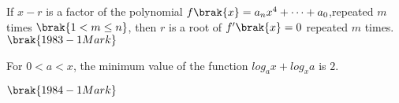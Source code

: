 \iffalse
\title{Assignment}
\author{ee24btech11056-S.Kavya Anvitha}
\section{true-false}     
\fi


\item[1.] If $x-r$ is a factor of the polynomial
$f\brak{x} = a_{n}x^{4}+\dots+a_{0}$,repeated $m$ times $\brak{1< m\leq n}$, 
then $r$ is a root of $f^\prime\brak{x}=0$ repeated $m$ times.
\hfill$\brak{1983 - 1 Mark}$

\item[2.] For $0 < a < x$, the minimum value of the function 
$log_a x + log_x a$ is $2$. 

\hfill$\brak{1984 - 1 Mark}$


